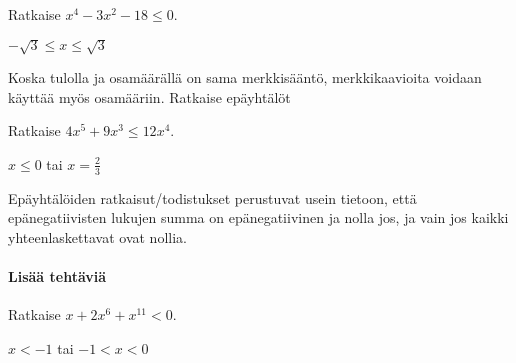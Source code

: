 \begin{tehtavasivu}
\begin{tehtava}
    Ratkaise $x^4-3x^2-18 \le 0$.
    \begin{vastaus}
        $-\sqrt{3}\le x \le \sqrt{3}$
    \end{vastaus}
\end{tehtava}

\begin{tehtava}
    Koska tulolla ja osamäärällä on sama merkkisääntö, merkkikaavioita
	voidaan käyttää myös osamääriin. Ratkaise epäyhtälöt
    \begin{alakohdat}
    \end{alakohdat}
    \begin{vastaus}
        \begin{alakohdat}
    	\end{alakohdat}
    \end{vastaus}
\end{tehtava}


\begin{tehtava}
    Ratkaise $4 x^5+9 x^3 \le 12 x^4$.
    \begin{vastaus}
        $x\le0$ tai $x=\frac{2}{3}$
    \end{vastaus}
\end{tehtava}

\begin{tehtava}
Epäyhtälöiden ratkaisut/todistukset perustuvat usein tietoon, että epänegatiivisten lukujen summa on epänegatiivinen ja nolla jos, ja vain jos kaikki yhteenlaskettavat ovat nollia.

\begin{alakohdat}
\end{alakohdat}

\begin{vastaus}
\begin{alakohdat}
\end{alakohdat}
\end{vastaus}
\end{tehtava}

\paragraph*{Lisää tehtäviä}

\begin{tehtava}
    Ratkaise $x+2x^6+x^{11}<0$.
    \begin{vastaus}
        $x<-1$ tai $ -1<x<0$
    \end{vastaus}
\end{tehtava}

\end{tehtavasivu}
